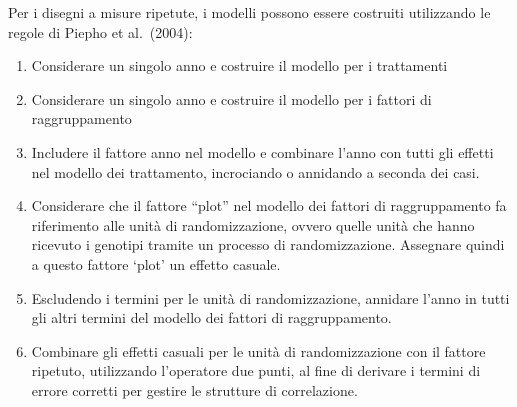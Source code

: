 \documentclass[
  12pt,
]{book}
\newenvironment{Shaded}{\begin{snugshade}}{\end{snugshade}}
\newcommand{\AttributeTok}[1]{\textcolor[rgb]{0.77,0.63,0.00}{#1}}
\newcommand{\CommentTok}[1]{\textcolor[rgb]{0.56,0.35,0.01}{\textit{#1}}}
\newcommand{\DocumentationTok}[1]{\textcolor[rgb]{0.56,0.35,0.01}{\textbf{\textit{#1}}}}
\newcommand{\FunctionTok}[1]{\textcolor[rgb]{0.00,0.00,0.00}{#1}}
\newcommand{\NormalTok}[1]{#1}
\newcommand{\OtherTok}[1]{\textcolor[rgb]{0.56,0.35,0.01}{#1}}
\newcommand{\SpecialCharTok}[1]{\textcolor[rgb]{0.00,0.00,0.00}{#1}}
\newcommand{\StringTok}[1]{\textcolor[rgb]{0.31,0.60,0.02}{#1}}
\providecommand{\tightlist}{%
  \setlength{\itemsep}{0pt}\setlength{\parskip}{0pt}}
\begin{document}
\begin{Shaded}
\end{Shaded}

Per i disegni a misure ripetute, i modelli possono essere costruiti utilizzando le regole di Piepho et al.~(2004):

\begin{enumerate}
\def\labelenumi{\arabic{enumi}.}
\tightlist
\item
  Considerare un singolo anno e costruire il modello per i trattamenti
\item
  Considerare un singolo anno e costruire il modello per i fattori di raggruppamento
\item
  Includere il fattore anno nel modello e combinare l'anno con tutti gli effetti nel modello dei trattamento, incrociando o annidando a seconda dei casi.
\item
  Considerare che il fattore ``plot'' nel modello dei fattori di raggruppamento fa riferimento alle unità di randomizzazione, ovvero quelle unità che hanno ricevuto i genotipi tramite un processo di randomizzazione. Assegnare quindi a questo fattore `plot' un effetto casuale.
\item
  Escludendo i termini per le unità di randomizzazione, annidare l'anno in tutti gli altri termini del modello dei fattori di raggruppamento.
\item
  Combinare gli effetti casuali per le unità di randomizzazione con il fattore ripetuto, utilizzando l'operatore due punti, al fine di derivare i termini di errore corretti per gestire le strutture di correlazione.
\end{enumerate}
\end{document}
